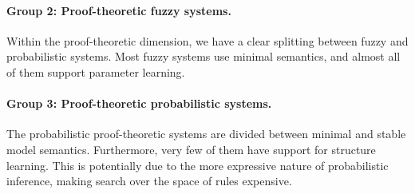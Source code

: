 \paragraph{Group 2: Proof-theoretic fuzzy systems.}
Within the proof-theoretic dimension, we have a clear splitting between fuzzy and probabilistic systems. Most fuzzy systems use minimal semantics, and almost all of them support parameter learning.
\paragraph{Group 3: Proof-theoretic probabilistic systems.}
The probabilistic proof-theoretic systems are divided between minimal and stable model semantics. Furthermore, very few of them have support for structure learning. This is potentially due to the more expressive nature of probabilistic inference, making search over the space of rules expensive.


